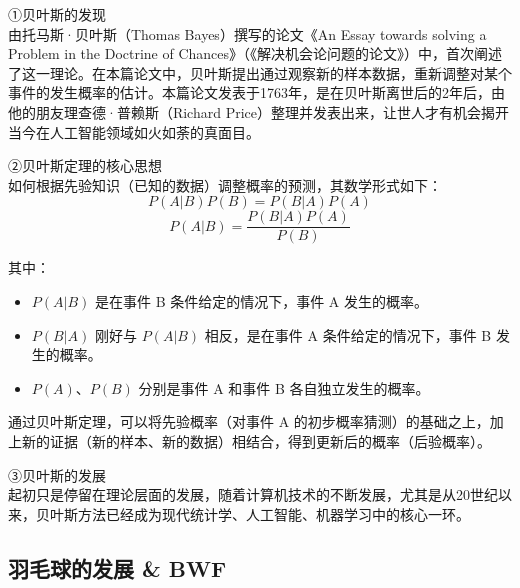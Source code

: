\documentclass[12pt]{article}
\begin{document}
①贝叶斯的发现 \\
由托马斯·贝叶斯（Thomas Bayes）撰写的论文《An Essay towards solving a Problem in the Doctrine of Chances》（《解决机会论问题的论文》）中，首次阐述了这一理论。在本篇论文中，贝叶斯提出通过观察新的样本数据，重新调整对某个事件的发生概率的估计。本篇论文发表于1763年，是在贝叶斯离世后的2年后，由他的朋友理查德·普赖斯（Richard Price）整理并发表出来，让世人才有机会揭开当今在人工智能领域如火如荼的真面目。

②贝叶斯定理的核心思想 \\
如何根据先验知识（已知的数据）调整概率的预测，其数学形式如下：
\begin{equation}
	P(A|B){P(B)}={P(B|A)P(A)}
	\end{equation}
\begin{equation}
    P(A|B)=\frac{P(B|A)P(A)}{P(B)}
\end{equation}

其中：
\begin{itemize}
	\item $P(A|B)$ 是在事件 B 条件给定的情况下，事件 A 发生的概率。
	\item $P(B|A)$ 刚好与 $P(A|B)$ 相反，是在事件 A 条件给定的情况下，事件 B 发生的概率。
	\item $P(A)$、$P(B)$ 分别是事件 A 和事件 B 各自独立发生的概率。
	\end{itemize}

通过贝叶斯定理，可以将先验概率（对事件 A 的初步概率猜测）的基础之上，加上新的证据（新的样本、新的数据）相结合，得到更新后的概率（后验概率）。

③贝叶斯的发展 \\
起初只是停留在理论层面的发展，随着计算机技术的不断发展，尤其是从20世纪以来，贝叶斯方法已经成为现代统计学、人工智能、机器学习中的核心一环。


\subsection{羽毛球的发展 \& BWF}

\end{document}
